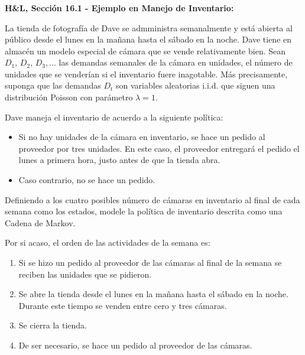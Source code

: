 \documentclass[ 10pt, xcolor = dvipsnames]{beamer}
\begin{document}
\begin{frame}[allowframebreaks]
\frametitle{\insertsection}

\textbf{H\&L, Secci\'on 16.1 - Ejemplo en Manejo de Inventario:}

La tienda de fotograf\'ia de Dave se admministra semanalmente y est\'a abierta al p\'ublico desde el lunes en la ma\~nana hasta el s\'abado en la noche. Dave tiene en almac\'en un modelo especial de c\'amara que se vende relativamente bien. \linebreak Sean $D_1, \, D_2, \, D_3, \dots$ las demandas semanales de la c\'amara en unidades, \linebreak \ie el n\'umero de unidades que se vender\'ian si el inventario fuere inagotable. \linebreak M\'as precisamente, suponga que las demandas $D_t$ son variables aleatorias i.i.d. \linebreak que siguen una distribuci\'on Poisson con par\'ametro $\lambda = 1$. 

Dave maneja el inventario de acuerdo a la siguiente pol\'itica:
\begin{itemize}
\item Si no hay unidades de la c\'amara en inventario, se hace un pedido al proveedor por tres unidades. En este caso, el proveedor entregar\'a el pedido \linebreak el lunes a primera hora, justo antes de que la tienda abra. 
\item Caso contrario, no se hace un pedido. 
\end{itemize}
\framebreak

Definiendo a los cuatro posibles n\'umero de c\'amaras en inventario al final de cada semana como los estados, modele la pol\'itica de inventario descrita como una Cadena de Markov. 

Por si acaso, el orden de las actividades de la \tava semana es: 
\begin{enumerate}
\item Si se hizo un pedido al proveedor de las c\'amaras al final de la \linebreak \tmava semana se reciben las unidades que se pidieron. 
\item Se abre la tienda desde el lunes en la ma\~nana hasta el s\'abado en la noche. Durante este tiempo se venden entre cero y tres c\'amaras. 
\item Se cierra la tienda. 
\item De ser necesario, se hace un pedido al proveedor de las c\'amaras. 
\end{enumerate}
\framebreak


\end{frame}
\end{document}
